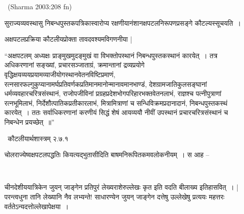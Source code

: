 ~\hfill (Sharma 2003:208 fn)

सुराज्यव्यवस्थासु निबन्धपुस्तकपत्रिकास्वारोप्य रक्षणीयानंशानक्षपटलनिरूपणप्रसङ्गे कौटल्यस्सूचयति~।

अक्षपटलप्रक्रिया कौटलीयप्रोक्ता तावदवश्यमविगणनीया |

“अक्षपटलम् अध्यक्षः प्राङ्मुखमुदङ्मुखं वा विभक्तोपस्थानं निबन्धपुस्तकस्थानं कारयेत्~। तत्र अधिकरणानां सङ्ख्यां, प्रचारसञ्जाताग्रं, क्रमान्तानां द्रव्यप्रयोगे वृद्धिक्षयव्ययप्रयामव्याजीयोगस्थानवेतनविष्टिप्रमाणं, रत्नसारफल्गुकुप्यानामर्घप्रतिवर्णकप्रतिमानमानोन्मानावमानभाण्डं, देशग्रामजातिकुलसङ्घानां धर्मव्यवहारचरित्रसंस्थानं, राजोपजीविनां प्रग्रहप्रदेशभोगपरिहारभक्तवेतनलाभं, राज्ञश्च पत्नीपुत्राणां रत्नभूमिलाभं, निर्देशौत्पातिकप्रतीकारलाभं, मित्रामित्राणां च सन्धिविक्रमप्रदानादानं, निबन्धपुस्तकस्थं कारयेत्~। ततः सर्वाधिकरणानां करणीयं सिद्धं शेषं आयव्ययौ नीवीं उपस्थानं प्रचारचरित्रसंस्थानं च निबन्धेन प्रयच्छेत्~॥” 

~\hfill कौटलीयार्थशास्त्रम् २.७.१

चोलराज्येष्वक्षपटलपद्धतिः कियत्यद्भुतासीदिति बाषमनिरूपितकमवलोकनीयम्~। स आह –

\begin{myquote}

~\hfill {}
\end{myquote}

चीनदेशीययात्रिकेन जुयन् जाङ्गेन  प्रतिपुरं  लेख्यराशेरुल्लेखः कृत इति वदति बीलाख्य इतिहासवित्~।  | परन्त्वधुना तानि लेख्यानि नैव लभ्यन्ते! साधारण्येन जुयन् जाङ्गेन दत्तेषु उल्लेखेषु प्रत्ययः महत्तरः वर्ततेऽन्यदत्तोल्लेखापेक्षया~।

